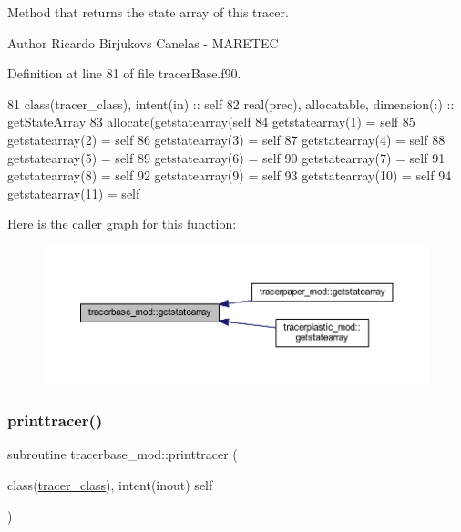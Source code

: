 Method that returns the state array of this tracer. 

\begin{DoxyAuthor}{Author}
Ricardo Birjukovs Canelas -\/ M\+A\+R\+E\+T\+EC 
\end{DoxyAuthor}


Definition at line 81 of file tracer\+Base.\+f90.


\begin{DoxyCode}
81     \textcolor{keywordtype}{class}(tracer\_class), \textcolor{keywordtype}{intent(in)} :: self
82     \textcolor{keywordtype}{real(prec)}, \textcolor{keywordtype}{allocatable}, \textcolor{keywordtype}{dimension(:)} :: getStateArray
83     \textcolor{keyword}{allocate}(getstatearray(self%
84     getstatearray(1) = self%
85     getstatearray(2) = self%
86     getstatearray(3) = self%
87     getstatearray(4) = self%
88     getstatearray(5) = self%
89     getstatearray(6) = self%
90     getstatearray(7) = self%
91     getstatearray(8) = self%
92     getstatearray(9) = self%
93     getstatearray(10) = self%
94     getstatearray(11) = self%
\end{DoxyCode}
Here is the caller graph for this function\+:\nopagebreak
\begin{figure}[H]
\begin{center}
\leavevmode
\includegraphics[width=350pt]{namespacetracerbase__mod_adbdd85bd57f1a9debbe7b682099afb1d_icgraph}
\end{center}
\end{figure}
\mbox{\label{namespacetracerbase__mod_ae320123e374df674769dbd48ba5ef46f}} 
\subsubsection{\texorpdfstring{printtracer()}{printtracer()}}
{\footnotesize\ttfamily subroutine tracerbase\+\_\+mod\+::printtracer (\begin{DoxyParamCaption}\item[{class(\mbox{\hyperlink{structtracerbase__mod_1_1tracer__class}{tracer\+\_\+class}}), intent(inout)}]{self }\end{DoxyParamCaption})\hspace{0.3cm}{\ttfamily [private]}}



